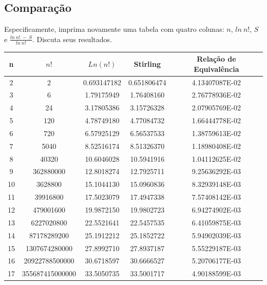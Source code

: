 \documentclass[a4paper, 12pt]{article}
\begin{document}
\subsection{Comparação}

Especificamente, imprima novamente uma tabela com quatro colunas: $n$, $ln \: n!$, $S$ e $ \frac{ln \:n! \: - \: S}{ln \: n!}$. Discuta seus resultados.

\begin{table}[H]
\centering
\begin{tabular}{c|c|c|c|c}
	n & $n!$ & $Ln(n!)$ & Stirling & Relação de Equivalência \\ \hline
	2 & 2 &   0.693147182     &   0.651806474     &    4.13407087E-02 \\ \hline
	3 & 6 &    1.79175949     &    1.76408160     &    2.76778936E-02 \\ \hline
	4 & 24 &    3.17805386     &    3.15726328     &    2.07905769E-02 \\ \hline
	5 & 120 &    4.78749180     &    4.77084732     &    1.66444778E-02 \\ \hline
	6 & 720 &    6.57925129     &    6.56537533     &    1.38759613E-02 \\ \hline
	7 & 5040 &    8.52516174     &    8.51326370     &    1.18980408E-02 \\ \hline
	8 & 40320 &    10.6046028     &    10.5941916     &    1.04112625E-02 \\ \hline
	9 & 362880000 &    12.8018274     &    12.7925711     &    9.25636292E-03 \\ \hline
	10 & 3628800 &    15.1044130     &    15.0960836     &    8.32939148E-03 \\ \hline
	11 & 39916800 &    17.5023079     &    17.4947338     &    7.57408142E-03 \\ \hline
	12 & 479001600 &    19.9872150     &    19.9802723     &    6.94274902E-03 \\ \hline
	13 & 6227020800 &    22.5521641     &    22.5457535     &    6.41059875E-03 \\ \hline
	14 & 87178289200 &    25.1912212     &    25.1852722     &    5.94902039E-03 \\ \hline
	15 & 1307674280000 &    27.8992710     &    27.8937187     &    5.55229187E-03 \\ \hline
	16 & 20922788500000 &    30.6718597     &    30.6666527     &    5.20706177E-03 \\ \hline
	17 & 355687415000000 &    33.5050735     &    33.5001717     &    4.90188599E-03 \\ \hline

\end{tabular}
\end{table}
\end{document}
